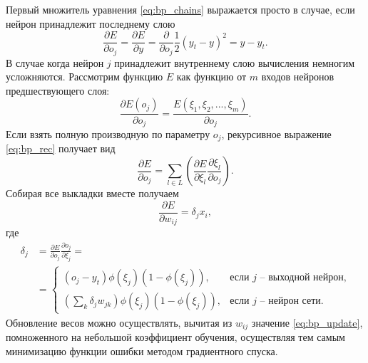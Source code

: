 \documentclass[a4paper,10pt]{article}
\begin{document}
\indent Первый множитель уравнения \eqref{eq:bp_chains} выражается просто в случае, если нейрон принадлежит последнему слою
\begin{equation*}
\frac{\partial E}{\partial o_{j}} = \frac{\partial E}{\partial y} = \frac{\partial}{\partial o_{j}} \frac{1}{2} (y_{t}-y)^2 = y - y_{t}  .
\end{equation*}
\indent В случае когда нейрон $j$ принадлежит внутреннему слою вычисления немногим усложняются. Рассмотрим функцию $E$ как функцию от $m$ входов нейронов предшествующего слоя:
\begin{equation}\label{eq:bp_rec}
\frac{\partial E(o_{j})}{\partial o_{j}} = \frac{E(\xi_{1}, \xi_{2},...,\xi_{m})}{\partial o_{j}}.
\end{equation}
Если взять полную производную по параметру $o_{j}$, рекурсивное выражение \eqref{eq:bp_rec} получает вид
\begin{equation*}
\frac{\partial E}{\partial o_{j}} = \sum_{l\in L}\left(\frac{\partial E}{\partial \xi_{l}} \frac{\partial \xi_{l}}{\partial o_{j}}\right).
\end{equation*}
\indent Собирая все выкладки вместе получаем
\begin{equation}\label{eq:bp_update}
\frac{\partial E}{\partial w_{ij}} = \delta_{j} x_{i},
\end{equation}
где
\begin{equation*}
\begin{split}
\delta_{j} &= \frac{\partial E}{\partial o_{j}} \frac{\partial o_{j}}{\partial \xi_{j}} = \\ &=\begin{cases} (o_{j}-y_{t}) \phi(\xi_{j})(1-\phi(\xi_{j})), & \mbox{если }j\mbox{ -- выходной нейрон,} \\ (\sum_{k}\delta_{j}w_{jk})\phi(\xi_{j})(1-\phi(\xi_{j})), & \mbox{если }j\mbox{ -- нейрон сети.} \end{cases}
\end{split}
\end{equation*}
\indent Обновление весов можно осуществлять, вычитая из $w_{ij}$ значение \eqref{eq:bp_update}, помноженного на небольшой коэффициент обучения, осуществляя тем самым минимизацию функции ошибки методом градиентного спуска.
\end{document}
